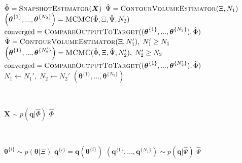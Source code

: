 \begin{algorithm}[H]
\footnotesize
\texttt{\\}
\begin{algorithmic}
	\State $\hat{\Phi} = \Call{SnapshotEstimator}{\boldsymbol{X}}$
	\State $\hat{\Psi} = \Call{ContourVolumeEstimator}{\Xi,N_1}$
	\State $\left(\boldsymbol{\theta}^{\{1\}},...,\boldsymbol{\theta}^{\{N_2\}}\right) = \Call{MCMC}{\hat{\Phi},\Xi, \hat{\Psi},N_2}$
	\State $\text{converged} = \Call{CompareOutputToTarget}{(\boldsymbol{\theta}^{\{1\}},...,\boldsymbol{\theta}^{\{N_2\}}), \hat{\Phi}}$
	 
		 \State $\hat{\Psi}=\Call{ContourVolumeEstimator}{\Xi, N_1'},\; N_1' \geq N_1$
         \State $\left( \boldsymbol{\theta}^{\{1\}},...,\boldsymbol{\theta}^{\{N_2'\}} \right)
                = \Call{MCMC}{\hat{\Phi},\Xi, \hat{\Psi},N_2'}, \; N_2' \geq N_2$
          \State $\text{converged} = \Call{CompareOutputToTarget}{(\boldsymbol{\theta}^{\{1\}},...,\boldsymbol{\theta}^{\{N_2'\}} ), \hat{\Phi}}$
          \State $N_1 \leftarrow N_1', \; N_2 \leftarrow N_2'$
	\EndWhile
	\State \Return $\left( \boldsymbol{\theta}^{\{1\}},...,\boldsymbol{\theta}^{\{N_2\}} \right)$
\EndProcedure
\end{algorithmic}

\texttt{\\}
\begin{algorithmic}
	\State $\boldsymbol{X} \sim p(\boldsymbol{q}|\hat{\Phi})$
	\State \Return $\hat{\Phi}$
\EndProcedure
\end{algorithmic}
	
\texttt{\\}
\begin{algorithmic}
		\State $\boldsymbol{\theta}^{\{i\}} \sim p(\boldsymbol{\theta}|\Xi)$           
		\State $\boldsymbol{q}^{\{i\}} = \boldsymbol{q}(\boldsymbol{\theta}^{\{i\}})$  
	\EndFor
	\State $\left( \boldsymbol{q}^{\{1\}}, \dots ,\boldsymbol{q}^{\{N_1\}} \right) \sim p(\boldsymbol{q}|\hat{\Psi})$
	\State \Return $\hat{\Psi}$
\EndProcedure
\end{algorithmic}


\end{algorithm}
